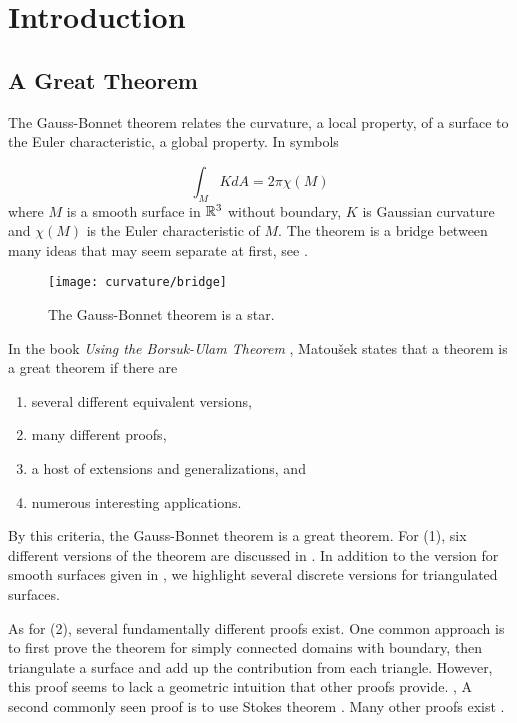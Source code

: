 \section{Introduction}
\label{sec:intro}

\subsection{A Great Theorem}
The Gauss-Bonnet theorem relates the curvature, a local property, of a surface
to the Euler characteristic, a global property. In symbols 

\begin{equation}\label{eqn:g-b-noboundary}
		\int_MK dA =2\pi \chi(M)
\end{equation}
where $M$ is a smooth surface in $\mathbb{R}^3$ without boundary, $K$ is Gaussian curvature
and $\chi(M)$ is the Euler characteristic of $M$.
The theorem is a bridge between many ideas that may
seem separate at first, see . 




\begin{figure}[htb]
\centering
\texttt{[image: curvature/bridge]}
\caption{The Gauss-Bonnet theorem is a star.}
\label{fig:bridge}
\end{figure}

In the book \emph{Using the Borsuk-Ulam Theorem}
\cite{jm08},
Matou\v{s}ek states that a theorem is a great theorem if there are
\begin{enumerate}[(1)]
\item several different equivalent versions,
\item many different proofs,
\item a host of extensions and generalizations, and
\item numerous interesting applications.
\end{enumerate}

By this criteria, the Gauss-Bonnet theorem is a great theorem.
For (1), six different versions of the theorem are discussed
in \cite{wu_historical_2008}. 
In addition to the version for smooth surfaces given in ,
we highlight
 several discrete versions for triangulated surfaces. 
  




 
 
As for (2), several fundamentally different proofs exist.  
One common approach is to first prove the theorem for simply connected domains
with boundary, then triangulate a surface and add up the contribution from each triangle.
However, this proof seems to lack a geometric intuition that other proofs provide. \cite{wu_historical_2008},
A second commonly seen proof is to use Stokes theorem  \cite{doc76,pressley_elementary_2010}.
Many other proofs exist \cite{guillemin_differential_2010,levi-bicycle,grinfeld_introduction_2013}.


